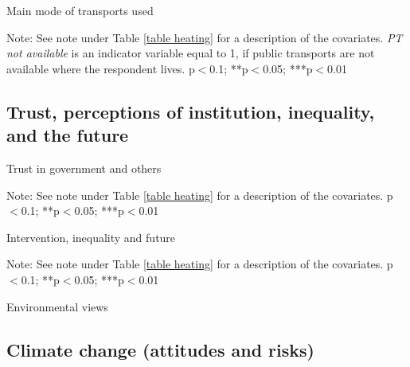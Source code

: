 \documentclass{article}
\begin{document}
\begin{landscape}
\begin{table}[h!]
	\caption{Main mode of transports used}
	\begin{center}
		\scalebox{0.6}{}
	\end{center}
	{\footnotesize Note: See note under Table \ref{table heating} for a description of the covariates. \textit{PT not available} is an indicator variable equal to 1, if public transports are not available where the respondent lives.
	\newline *p$<$0.1; **p$<$0.05; ***p$<$0.01}	
\end{table}	
\end{landscape}

\clearpage
\subsection{Trust, perceptions of institution, inequality, and the future}

\begin{table}[h!]
	\caption{Trust in government and others}
	\begin{center}
		\scalebox{0.7}{}
	\end{center}
	{\footnotesize Note: See note under Table \ref{table heating} for a description of the covariates.
		\newline *p$<$0.1; **p$<$0.05; ***p$<$0.01}	
\end{table}	

\begin{table}[h!]
	\caption{Intervention, inequality and future}
	\begin{center}
		\scalebox{0.7}{}
	\end{center}
	{\footnotesize Note: See note under Table \ref{table heating} for a description of the covariates.
	\newline *p$<$0.1; **p$<$0.05; ***p$<$0.01}
\end{table}	

\begin{table}[h!]
	\caption{Environmental views}
	\begin{center}
		\scalebox{0.7}{}
	\end{center}
\end{table}	

\clearpage
\subsection{Climate change (attitudes and risks)}
\end{document}
